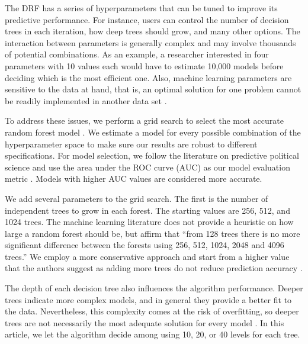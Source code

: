 \documentclass[a4paper,12pt]{article}
\begin{document}
The DRF has a series of hyperparameters that can be tuned to improve its predictive performance. For instance, users can control the number of decision trees in each iteration, how deep trees should grow, and many other options. The interaction between parameters is generally complex and may involve thousands of potential combinations. As an example, a researcher interested in four parameters with 10 values each would have to estimate 10,000 models before deciding which is the most efficient one. Also, machine learning parameters are sensitive to the data at hand, that is, an optimal solution for one problem cannot be readily implemented in another data set \citep{genuer2008random,goldstein2010application,jones2015exploratory}.
	
To address these issues, we perform a grid search to select the most accurate random forest model \citep[123]{cook2017h2o}. We estimate a model for every possible combination of the hyperparameter space to make sure our results are robust to different specifications. For model selection, we follow the literature on predictive political science and use the area under the ROC curve (AUC) as our model evaluation metric \citep[e.g.,][]{hill2014empirical,ward2010perils,ward2013learning}. Models with higher AUC values are considered more accurate.
	
We add several parameters to the grid search. The first is the number of independent trees to grow in each forest. The starting values are 256, 512, and 1024 trees. The machine learning literature does not provide a heuristic on how large a random forest should be, but \citet[166]{oshiro2012many} affirm that ``from 128 trees there is no more significant difference between the forests using 256, 512, 1024, 2048 and 4096 trees.'' We employ a more conservative approach and start from a higher value that the authors suggest as adding more trees do not reduce prediction accuracy \citep[7]{breiman2001statistical}.
	
The depth of each decision tree also influences the algorithm performance. Deeper trees indicate more complex models, and in general they provide a better fit to the data. Nevertheless, this complexity comes at the risk of overfitting, so deeper trees are not necessarily the most adequate solution for every model \citep[596]{friedman2001greedy,segal2004machine}. In this article, we let the algorithm decide among using 10, 20, or 40 levels for each tree. 
	
\end{document}

